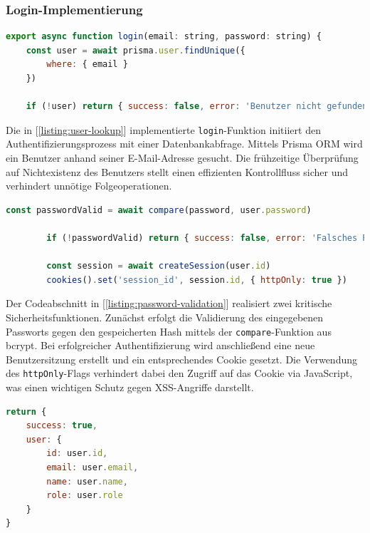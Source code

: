 \subsubsection{Login-Implementierung}
\begin{lstlisting}[language=JavaScript, caption={Benutzersuche in der Datenbank.}, label={listing:user-lookup}]
export async function login(email: string, password: string) {
	const user = await prisma.user.findUnique({
		where: { email }
	})
			
	if (!user) return { success: false, error: 'Benutzer nicht gefunden' }
\end{lstlisting}
	
	Die in [\ref{listing:user-lookup}] implementierte \texttt{login}-Funktion initiiert den Authentifizierungsprozess mit einer Datenbankabfrage. Mittels Prisma ORM wird ein Benutzer anhand seiner E-Mail-Adresse gesucht. Die frühzeitige Überprüfung auf Nichtexistenz des Benutzers stellt einen effizienten Kontrollfluss sicher und verhindert unnötige Folgeoperationen.
	
\begin{lstlisting}[language=JavaScript, caption={Passwortvalidierung und Sitzungserstellung.}, label={listing:password-validation}]
	const passwordValid = await compare(password, user.password)
			
		if (!passwordValid) return { success: false, error: 'Falsches Passwort' }
			
		const session = await createSession(user.id)
		cookies().set('session_id', session.id, { httpOnly: true })
\end{lstlisting}
	
	Der Codeabschnitt in [\ref{listing:password-validation}] realisiert zwei kritische Sicherheitsfunktionen. Zunächst erfolgt die Validierung des eingegebenen Passworts gegen den gespeicherten Hash mittels der \texttt{compare}-Funktion aus bcrypt. Bei erfolgreicher Authentifizierung wird anschließend eine neue Benutzersitzung erstellt und ein entsprechendes Cookie gesetzt. Die Verwendung des \texttt{httpOnly}-Flags verhindert dabei den Zugriff auf das Cookie via JavaScript, was einen wichtigen Schutz gegen XSS-Angriffe darstellt.
	
\begin{lstlisting}[language=JavaScript, caption={Rückgabeobjekt nach erfolgreicher Authentifizierung.}, label={listing:auth-return}]
return { 
	success: true, 
	user: { 
		id: user.id, 
		email: user.email, 
		name: user.name, 
		role: user.role 
	} 
}
\end{lstlisting}


